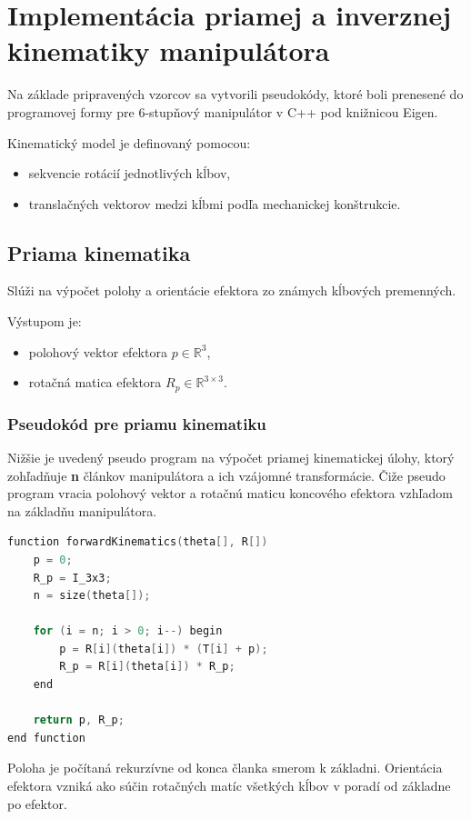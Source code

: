 \section{Implementácia priamej a inverznej kinematiky manipulátora}

Na základe pripravených vzorcov sa vytvorili pseudokódy, ktoré boli prenesené do programovej formy pre 6-stupňový manipulátor v C++ pod knižnicou Eigen.

Kinematický model je definovaný pomocou:
\begin{itemize}
	\item sekvencie rotácií jednotlivých kĺbov,
	\item translačných vektorov medzi kĺbmi podľa mechanickej konštrukcie.
\end{itemize}

\subsection{Priama kinematika}
Slúži na výpočet polohy a orientácie efektora zo známych kĺbových premenných.

Výstupom je:
\begin{itemize}
	\item polohový vektor efektora $p \in \mathbb{R}^3$,
	\item rotačná matica efektora $R_p \in \mathbb{R}^{3 \times 3}$.
\end{itemize}

\subsubsection{Pseudokód pre priamu kinematiku}
Nižšie je uvedený pseudo program na výpočet priamej kinematickej úlohy, ktorý zohľadňuje \textbf{n} článkov manipulátora a ich vzájomné transformácie.
Čiže pseudo program vracia polohový vektor a rotačnú maticu koncového efektora vzhľadom na základňu manipulátora.

\begin{lstlisting}[caption={Výpočet priamej kinematickej úlohy}, language=C]
function forwardKinematics(theta[], R[])
    p = 0;
    R_p = I_3x3;
    n = size(theta[]);
    
    for (i = n; i > 0; i--) begin
        p = R[i](theta[i]) * (T[i] + p);
        R_p = R[i](theta[i]) * R_p;
    end
    
    return p, R_p;
end function
\end{lstlisting}

Poloha je počítaná rekurzívne od konca članka smerom k základni. Orientácia efektora vzniká ako súčin rotačných matíc všetkých kĺbov v poradí od základne po efektor.

